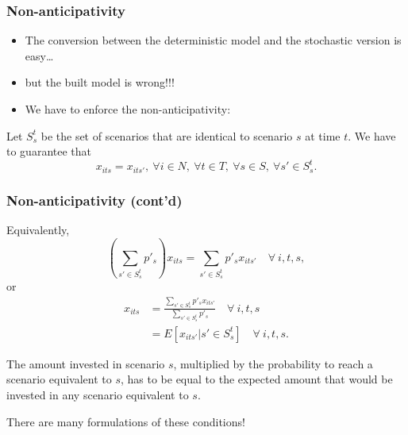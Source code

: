 \documentclass{beamer}
\begin{document}
\begin{frame}
\frametitle{Non-anticipativity}

\begin{itemize}
\item
The conversion between the deterministic model and the stochastic version is easy\ldots
\item
but the built model is wrong!!!
\item
We have to enforce the {\red non-anticipativity}:
\end{itemize}

Let $S_s^t$ be the set of scenarios that are identical to scenario $s$ at time $t$.
We have to guarantee that
\[
x_{its} = x_{its'},\ \forall i \in N,\ \forall t \in T,\ \forall s \in
S,\ \forall s' \in S_s^t.
\]

\end{frame}

\begin{frame}
\frametitle{Non-anticipativity (cont'd)}

Equivalently,
\[
\left( \sum_{s' \in S_s^t} p'_s \right) x_{its} = \sum_{s' \in S_s^t} p'_s x_{its'} \quad \forall\ i,t,s,
\]
or
\begin{align*}
 x_{its}
&= \frac{\sum_{s' \in S_s^t} p'_s x_{its'}}{\sum_{s' \in S_s^t} p'_s} \quad \forall\ i,t,s \\
&= E[ x_{its'} | s' \in S_s^t ] \quad \forall\ i,t,s.
\end{align*}

The amount invested in scenario $s$, multiplied by the probability to reach a scenario equivalent to $s$, has to be equal to the expected amount that would be invested in any scenario equivalent to $s$.

There are many formulations of these conditions!

\end{frame}
\end{document}
